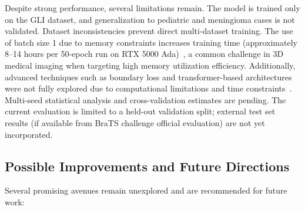 \documentclass[conference]{IEEEtran}
\begin{document}
Despite strong performance, several limitations remain. The model is trained only on the GLI dataset, and generalization to pediatric and meningioma cases is not validated. Dataset inconsistencies prevent direct multi-dataset training. The use of batch size 1 due to memory constraints increases training time (approximately 8--14 hours per 50-epoch run on RTX 5000 Ada)~\cite{6}, a common challenge in 3D medical imaging when targeting high memory utilization efficiency. Additionally, advanced techniques such as boundary loss and transformer-based architectures were not fully explored due to computational limitations and time constraints~\cite{18}. Multi-seed statistical analysis and cross-validation estimates are pending. The current evaluation is limited to a held-out validation split; external test set results (if available from BraTS challenge official evaluation) are not yet incorporated.

\subsection{Possible Improvements and Future Directions}

Several promising avenues remain unexplored and are recommended for future work:
\end{document}
